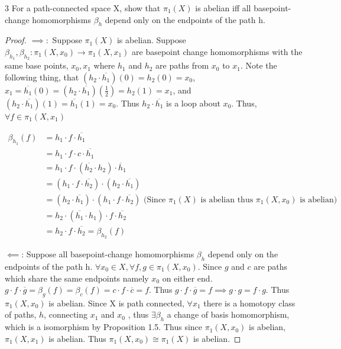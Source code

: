 \documentclass{article}
\begin{document}
\bigskip

\begin{PROB}{3}\label{Problem 3.}
    For a path-connected space X, show that $\pi_1(X)$ is abelian iﬀ all basepoint-change homomorphisms $\beta_h$ depend only on the endpoints of the path h.
\end{PROB}
\begin{proof}
    $\implies:$ Suppose $\pi_1(X)$ is abelian. Suppose $\beta_{h_1}, \beta_{h_2}: \pi_1(X, x_0) \to \pi_1(X, x_1)$ are basepoint change homomorphisms with the same base points, $x_0, x_1$ where $h_1$ and $h_2$ are paths from $x_0$ to $x_1$. Note the following thing, that $(h_2 \cdot \overline{h_1})(0) = h_2(0) = x_0$, $x_1 = \overline{h_1}(0) = (h_2 \cdot \overline{h_1})(\frac{1}{2}) = h_2(1) = x_1$, and $(h_2 \cdot \overline{h_1})(1) = \overline{h_1}(1) = x_0$. Thus $h_2 \cdot \overline{h_1}$ is a loop about $x_0$. Thus, $\forall f \in \pi_1(X, x_1)$  
    
    
    \begin{align*}
        \beta_{h_1}(f) &= h_1 \cdot f \cdot \overline{h_1}\\
        &= h_1 \cdot f \cdot c \cdot \overline{h_1} \\
        &= h_1 \cdot f \cdot (\overline{h_2} \cdot h_2) \cdot \overline{h}_1 \\ 
        &= (h_1 \cdot f \cdot \overline{h_2}) \cdot (h_2 \cdot \overline{h_1}) \\
        &= (h_2 \cdot \overline{h_1}) \cdot (h_1 \cdot f \cdot \overline{h_2}) \text{  (Since $\pi_1(X)$ is abelian thus $\pi_1(X, x_0)$ is abelian)} \\
        &= h_2 \cdot (\overline{h_1} \cdot h_1) \cdot f \cdot \overline{h_2} \\ 
        &= h_2 \cdot f \cdot \overline{h_2} = \beta_{h_2}(f)
    \end{align*}

    $\impliedby$: Suppose all basepoint-change homomorphisms $\beta_h$ depend only on the endpoints of the path h. $\forall x_0 \in X, \forall f, g \in \pi_1(X, x_0)$. Since $g$ and $c$ are paths which share the same endpoints namely $x_0$ on either end. $ g \cdot f \cdot \overline{g} = \beta_{g}(f) =\beta_{c}(f) = c \cdot f \cdot \overline{c} = f$. Thus $g \cdot f \cdot \overline{g} = f \implies g \cdot g = f \cdot g$. Thus $\pi_1(X, x_0)$ is abelian. Since X is path connected, $\forall x_1$ there is a homotopy class of paths, $h$, connecting $x_1$ and $x_0$ , thus $\exists \beta_{h}$ a change of basis homomorphism, which is a isomorphism by Proposition 1.5. Thus since $\pi_1(X, x_0)$ is abelian, $\pi_1(X, x_1)$ is abelian. Thus $\pi_1(X, x_0) \cong \pi_1(X)$ is abelian. 
\end{proof}
\end{document}
